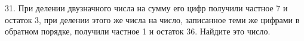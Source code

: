 31. При делении двузначного числа на сумму его цифр получили частное 7 и остаток 3, при делении этого же числа на число, записанное теми же цифрами в обратном порядке, получили частное 1 и остаток 36. Найдите это число.\\
